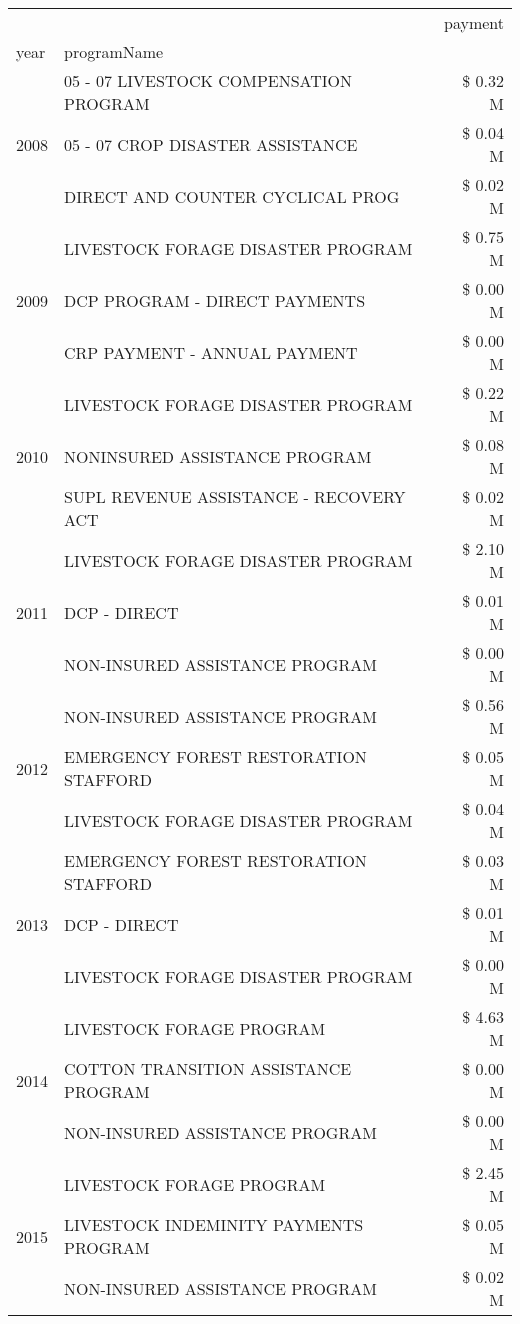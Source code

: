 \begin{tabular}{llr}
\toprule
 &  & payment \\
year & programName &  \\
\midrule
\multirow[t]{3}{*}{2008} & 05 - 07 LIVESTOCK COMPENSATION PROGRAM & \$ 0.32 M \\
 & 05 - 07 CROP DISASTER ASSISTANCE & \$ 0.04 M \\
 & DIRECT AND COUNTER CYCLICAL PROG & \$ 0.02 M \\
\cline{1-3}
\multirow[t]{3}{*}{2009} & LIVESTOCK FORAGE DISASTER  PROGRAM & \$ 0.75 M \\
 & DCP PROGRAM - DIRECT PAYMENTS & \$ 0.00 M \\
 & CRP PAYMENT - ANNUAL PAYMENT & \$ 0.00 M \\
\cline{1-3}
\multirow[t]{3}{*}{2010} & LIVESTOCK FORAGE DISASTER PROGRAM & \$ 0.22 M \\
 & NONINSURED ASSISTANCE PROGRAM & \$ 0.08 M \\
 & SUPL REVENUE ASSISTANCE - RECOVERY ACT & \$ 0.02 M \\
\cline{1-3}
\multirow[t]{3}{*}{2011} & LIVESTOCK FORAGE DISASTER PROGRAM & \$ 2.10 M \\
 & DCP - DIRECT & \$ 0.01 M \\
 & NON-INSURED ASSISTANCE PROGRAM & \$ 0.00 M \\
\cline{1-3}
\multirow[t]{3}{*}{2012} & NON-INSURED ASSISTANCE PROGRAM & \$ 0.56 M \\
 & EMERGENCY FOREST RESTORATION STAFFORD & \$ 0.05 M \\
 & LIVESTOCK FORAGE DISASTER PROGRAM & \$ 0.04 M \\
\cline{1-3}
\multirow[t]{3}{*}{2013} & EMERGENCY FOREST RESTORATION STAFFORD & \$ 0.03 M \\
 & DCP - DIRECT & \$ 0.01 M \\
 & LIVESTOCK FORAGE DISASTER PROGRAM & \$ 0.00 M \\
\cline{1-3}
\multirow[t]{3}{*}{2014} & LIVESTOCK FORAGE PROGRAM & \$ 4.63 M \\
 & COTTON TRANSITION ASSISTANCE PROGRAM & \$ 0.00 M \\
 & NON-INSURED ASSISTANCE PROGRAM & \$ 0.00 M \\
\cline{1-3}
\multirow[t]{3}{*}{2015} & LIVESTOCK FORAGE PROGRAM & \$ 2.45 M \\
 & LIVESTOCK INDEMINITY PAYMENTS PROGRAM & \$ 0.05 M \\
 & NON-INSURED ASSISTANCE PROGRAM & \$ 0.02 M \\

\end{tabular}
